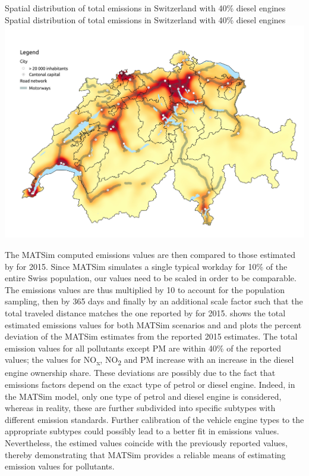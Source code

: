 \createfigure%
{Spatial distribution of total emissions in Switzerland with 40\% diesel engines}%
{Spatial distribution of total emissions in Switzerland with 40\% diesel engines}%
{\label{fig:spatialEmissions}}%
{\includegraphics[width=1.0\textwidth, angle=0]{figures/total_emissions_heatmap.pdf}}%
{}

The MATSim computed emissions values are then compared to those estimated by \citet{foen2010pollutants} for 2015.
Since MATSim simulates a single typical workday for 10\% of the entire Swiss population, our values need to be scaled in order to be comparable.
The emissions values are thus multiplied by 10 to account for the population sampling, then by 365 days and finally by an additional scale factor such that the total traveled distance matches the one reported by \citet{foen2010pollutants} for 2015.
 shows the total estimated emissions values for both MATSim scenarios and \citet{foen2010pollutants} and  plots the percent deviation of the MATSim estimates from the reported 2015 estimates.
The total emission values for all pollutants except PM are within 40\% of the reported values; the values for NO\textsubscript{x}, NO\textsubscript{2} and PM increase with an increase in the diesel engine ownership share.
These deviations are possibly due to the fact that emissions factors depend on the exact type of petrol or diesel engine.
Indeed, in the MATSim model, only one type of petrol and diesel engine is considered, whereas in reality, these are further subdivided into specific subtypes with different emission standards.
Further calibration of the vehicle engine types to the appropriate subtypes could possibly lead to a better fit in emissions values.
Nevertheless, the estimed values coincide with the previously reported values, thereby demonstrating that MATSim provides a reliable means of estimating emission values for pollutants.

